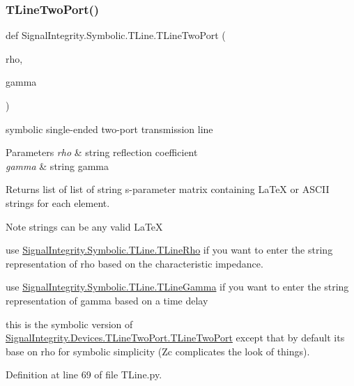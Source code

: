 \mbox{\label{namespaceSignalIntegrity_1_1Symbolic_1_1TLine_a03366e71575a7dda96f6cba322d2ffce}} 
\subsubsection{\texorpdfstring{T\+Line\+Two\+Port()}{TLineTwoPort()}}
{\footnotesize\ttfamily def Signal\+Integrity.\+Symbolic.\+T\+Line.\+T\+Line\+Two\+Port (\begin{DoxyParamCaption}\item[{}]{rho,  }\item[{}]{gamma }\end{DoxyParamCaption})}



symbolic single-\/ended two-\/port transmission line 


\begin{DoxyParams}{Parameters}
{\em rho} & string reflection coefficient \\
\hline
{\em gamma} & string gamma \\
\hline
\end{DoxyParams}
\begin{DoxyReturn}{Returns}
list of list of string s-\/parameter matrix containing La\+TeX or A\+S\+C\+II strings for each element. 
\end{DoxyReturn}
\begin{DoxyNote}{Note}
strings can be any valid La\+TeX 

use \hyperlink{namespaceSignalIntegrity_1_1Symbolic_1_1TLine_a6e67758dfbb8c37100cd86a52783b20c}{Signal\+Integrity.\+Symbolic.\+T\+Line.\+T\+Line\+Rho} if you want to enter the string representation of rho based on the characteristic impedance. 

use \hyperlink{namespaceSignalIntegrity_1_1Symbolic_1_1TLine_a1789044d24922e3256a701fa4cca3717}{Signal\+Integrity.\+Symbolic.\+T\+Line.\+T\+Line\+Gamma} if you want to enter the string representation of gamma based on a time delay 

this is the symbolic version of \hyperlink{namespaceSignalIntegrity_1_1Devices_1_1TLineTwoPort_a7bd18f7b4b86ece0e8648407add746d4}{Signal\+Integrity.\+Devices.\+T\+Line\+Two\+Port.\+T\+Line\+Two\+Port} except that by default it\textquotesingle{}s base on rho for symbolic simplicity (Zc complicates the look of things). 
\end{DoxyNote}


Definition at line 69 of file T\+Line.\+py.

